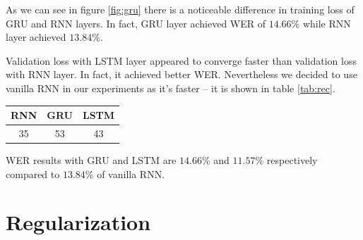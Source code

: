 \documentclass[licencjacka,en]{pracamgr}
\begin{document}
	\noindent
	As we can see in figure \ref{fig:gru} there is a noticeable difference in training loss of GRU and RNN layers. In fact, GRU layer achieved WER of $14.66$\% while RNN layer achieved $13.84$\%.
	\\
	
	\noindent%
	\begin{minipage}{\linewidth}%
		\label{fig:lstm}		     
	\end{minipage}
	
	Validation loss with LSTM layer appeared to converge faster than validation loss with RNN layer. In fact, it achieved better WER. Nevertheless we decided to use vanilla RNN in our experiments as it's faster -- it is shown in table \ref{tab:rec}.
	
	{
		\centering
		\begin{tabular}{|c|c|c|}
			\hline
			RNN & GRU & LSTM \\
			\hline
			\hline
			35 & 53 & 43 \\
			\hline
		\end{tabular}
		\label{tab:rec}
	}
	
	WER results with GRU and LSTM are $14.66$\% and $11.57$\% respectively compared to $13.84$\% of vanilla RNN.
	

	\section{Regularization}
\end{document}
